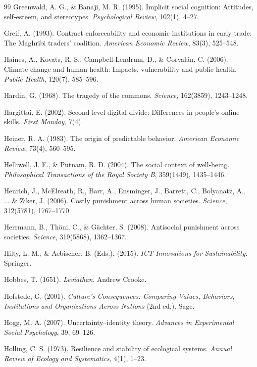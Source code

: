 \begin{thebibliography}{99}
Greenwald, A. G., \& Banaji, M. R. (1995).
Implicit social cognition: Attitudes, self-esteem, and stereotypes.
\textit{Psychological Review}, 102(1), 4--27.

Greif, A. (1993).
Contract enforceability and economic institutions in early trade: The Maghribi traders' coalition.
\textit{American Economic Review}, 83(3), 525--548.

Haines, A., Kovats, R. S., Campbell-Lendrum, D., \& Corvalán, C. (2006).
Climate change and human health: Impacts, vulnerability and public health.
\textit{Public Health}, 120(7), 585--596.

Hardin, G. (1968).
The tragedy of the commons.
\textit{Science}, 162(3859), 1243--1248.

Hargittai, E. (2002).
Second-level digital divide: Differences in people's online skills.
\textit{First Monday}, 7(4).

Heiner, R. A. (1983).
The origin of predictable behavior.
\textit{American Economic Review}, 73(4), 560--595.

Helliwell, J. F., \& Putnam, R. D. (2004).
The social context of well-being.
\textit{Philosophical Transactions of the Royal Society B}, 359(1449), 1435--1446.

Henrich, J., McElreath, R., Barr, A., Ensminger, J., Barrett, C., Bolyanatz, A., ... \& Ziker, J. (2006).
Costly punishment across human societies.
\textit{Science}, 312(5781), 1767--1770.

Herrmann, B., Thöni, C., \& Gächter, S. (2008).
Antisocial punishment across societies.
\textit{Science}, 319(5868), 1362--1367.

Hilty, L. M., \& Aebischer, B. (Eds.). (2015).
\textit{ICT Innovations for Sustainability}.
Springer.

Hobbes, T. (1651).
\textit{Leviathan}.
Andrew Crooke.

Hofstede, G. (2001).
\textit{Culture's Consequences: Comparing Values, Behaviors, Institutions and Organizations Across Nations} (2nd ed.).
Sage.

Hogg, M. A. (2007).
Uncertainty–identity theory.
\textit{Advances in Experimental Social Psychology}, 39, 69--126.

Holling, C. S. (1973).
Resilience and stability of ecological systems.
\textit{Annual Review of Ecology and Systematics}, 4(1), 1--23.


\end{thebibliography}
